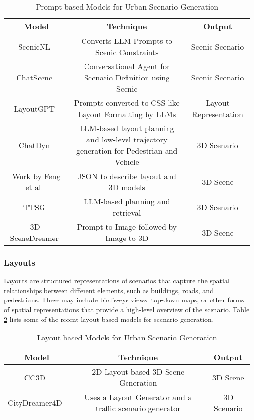 \documentclass{article}
\begin{document}
\begin{table}[ht]
\centering
    \begin{tabular}{|c|c|c|}
    \hline
    \textbf{Model} & \textbf{Technique} & \textbf{Output} \\ \hline
    ScenicNL~\cite{elmaaroufi2024scenicnl} & Converts LLM Prompts to Scenic Constraints & Scenic Scenario \\ \hline
    ChatScene~\cite{zhang2024chatscene} & Conversational Agent for Scenario Definition using Scenic & Scenic Scenario \\ \hline
    LayoutGPT~\cite{feng2023layoutgpt} & Prompts converted to CSS-like Layout Formatting by LLMs & Layout Representation \\ \hline
    ChatDyn~\cite{wei2024chatdyn} & LLM-based layout planning and low-level trajectory generation for Pedestrian and Vehicle & 3D Scenario \\ \hline
    Work by Feng et al.~\cite{feng2025text} & JSON to describe layout and 3D models & 3D Scene \\ \hline
    TTSG~\cite{ruan2024traffic} & LLM-based planning and retrieval & 3D Scenario \\ \hline
    3D-SceneDreamer~\cite{zhang20243d} & Prompt to Image followed by Image to 3D & 3D Scene \\ \hline
    \end{tabular}
\caption{Prompt-based Models for Urban Scenario Generation}
\label{tab:prompt_based_models}
\end{table}

\subsubsection{Layouts}

Layouts are structured representations of scenarios that capture the spatial relationships between different elements, such as buildings, roads, and pedestrians. These may include bird's-eye views, top-down maps, or other forms of spatial representations that provide a high-level overview of the scenario. Table \ref{tab:layout_based_models} lists some of the recent layout-based models for scenario generation.

\begin{table}[ht]
\centering
    \begin{tabular}{|c|c|c|}
    \hline
    \textbf{Model} & \textbf{Technique} & \textbf{Output} \\ \hline
    CC3D~\cite{bahmani2023cc3d} & 2D Layout-based 3D Scene Generation & 3D Scene \\ \hline
    CityDreamer4D~\cite{xie2025citydreamer4d} & Uses a Layout Generator and a traffic scenario generator & 3D Scenario \\ \hline
    \end{tabular}
\caption{Layout-based Models for Urban Scenario Generation}
\label{tab:layout_based_models}
\end{table}
\end{document}
